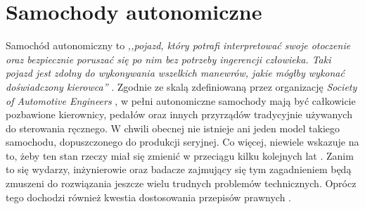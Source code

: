\chapter{Samochody autonomiczne}
\label{SDCsChapter}
\vspace{-1cm}
Samochód autonomiczny to \textit{,,pojazd, który potrafi interpretować swoje otoczenie oraz bezpiecznie poruszać się po nim bez potrzeby ingerencji człowieka. Taki pojazd jest zdolny do wykonywania wszelkich manewrów, jakie mógłby wykonać doświadczony kierowca''} \cite{galios:thesis}.
Zgodnie ze skalą zdefiniowaną przez organizację \textit{Society of Automotive Engineers} \cite{synopsys:whatIsAutonomousCar}, w pełni autonomiczne samochody mają być całkowicie pozbawione kierownicy, pedałów oraz innych przyrządów tradycyjnie używanych do sterowania ręcznego. W chwili obecnej nie istnieje ani jeden model takiego samochodu, dopuszczonego do produkcji seryjnej. Co więcej, niewiele wskazuje na to, żeby ten stan rzeczy miał się zmienić w przeciągu kilku kolejnych lat \cite{adams:yearsAwaySDCs, houwelling:wontGetSdcSoon}. Zanim to się wydarzy, inżynierowie oraz badacze zajmujący się tym zagadnieniem będą zmuszeni do rozwiązania jeszcze wielu trudnych problemów technicznych. Oprócz tego dochodzi również kwestia dostosowania przepisów prawnych \cite{businessInsider:autonomiczneAutaPrawo}.

